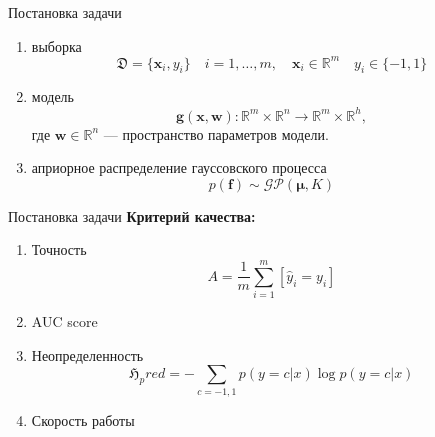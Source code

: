 \documentclass[9pt,pdf,hyperref={unicode}]{beamer}
\begin{document}


\begin{frame}{Постановка задачи}
    \begin{enumerate}
        \item выборка 
    $$\mathfrak{D} = \{ \mathbf{x}_i, y_i\} \quad i = 1,\dots, m, \quad \mathbf{x}_i \in \mathbb{R}^m \quad y_i \in \{-1,1\} $$
        \item модель
    $$\mathbf{g}(\mathbf{x},\mathbf{w}):\mathbb{R}^m \times \mathbb{R}^n \longrightarrow\mathbb{R}^m \times \mathbb{R}^h,$$
     где $\mathbf{w} \in \mathbb{R}^n$ --- пространство параметров модели.
        \item априорное распределение гауссовского процесса 
    $$p(\mathbf{f}) \sim \mathcal{GP} (\boldsymbol{\mu}, K)$$
    \end{enumerate}
\end{frame}
\begin{frame}{Постановка задачи}
\textbf{Критерий качества:} 
\begin{enumerate}
    \item Точность 
    $$A = \frac{1}{m}\sum\limits_{i=1}^m [\hat{y}_i = y_i] $$
    \item AUC score
    \item Неопределенность
    $$\mathfrak{H}_pred = -\sum\limits_{c = -1,1} p(y=c|x) \log p(y=c|x)$$
    \item Скорость работы
\end{enumerate}
\end{frame}
\end{document}
